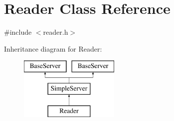 \hypertarget{classReader}{\section{Reader Class Reference}
\label{classReader}
}


{\ttfamily \#include $<$reader.\-h$>$}

Inheritance diagram for Reader\-:\begin{figure}[H]
\begin{center}
\leavevmode
\includegraphics[height=3.000000cm]{classReader}
\end{center}
\end{figure}
